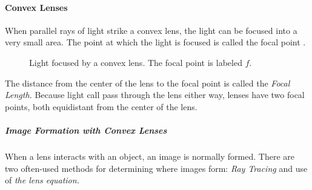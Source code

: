 \paragraph{Convex Lenses}  

When parallel rays of light strike a convex lens, the light can be focused into a very small area.  The point at which the light is focused is called the focal point .  

	\begin{figure} [H]
	
	\begin{center}
		\caption{Light focused by a convex lens.  The focal point is labeled $f$.}
	\end{center}
\end{figure}

The distance from the center of the lens to the focal point is called the \textit{Focal Length.}   Because light call pass through the lens either way, lenses have two focal points, both equidistant from the center of the lens.  

\subparagraph{Image Formation with Convex Lenses}
When a lens interacts with an object, an image is normally formed.  There are two often-used methods for determining where images form: \textit{Ray Tracing} and use of \textit{the lens equation.}

